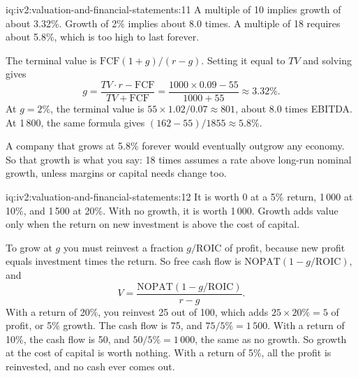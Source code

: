 \begin{solution}{iq:iv2:valuation-and-financial-statements:11}
A multiple of 10 implies growth of about 3.32\%. Growth of 2\% implies about 8.0 times. A multiple of 18 requires about 5.8\%, which is too high to last forever.

The terminal value is $\mathrm{FCF}(1 + g)/(r - g)$. Setting it equal to $TV$ and solving gives
\[
g = \frac{TV \cdot r - \mathrm{FCF}}{TV + \mathrm{FCF}} = \frac{1000 \times 0.09 - 55}{1000 + 55} \approx 3.32\%.
\]
At $g = 2\%$, the terminal value is $55 \times 1.02/0.07 \approx 801$, about 8.0 times EBITDA. At 1\,800, the same formula gives $(162 - 55)/1855 \approx 5.8\%$.

A company that grows at 5.8\% forever would eventually outgrow any economy. So that growth is what you say: 18 times assumes a rate above long-run nominal growth, unless margins or capital needs change too.

\end{solution}

\begin{solution}{iq:iv2:valuation-and-financial-statements:12}
It is worth 0 at a 5\% return, 1\,000 at 10\%, and 1\,500 at 20\%. With no growth, it is worth 1\,000. Growth adds value only when the return on new investment is above the cost of capital.

To grow at $g$ you must reinvest a fraction $g/\mathrm{ROIC}$ of profit, because new profit equals investment times the return. So free cash flow is $\mathrm{NOPAT}(1 - g/\mathrm{ROIC})$, and
\[
V = \frac{\mathrm{NOPAT}\left(1 - g/\mathrm{ROIC}\right)}{r - g}.
\]
With a return of 20\%, you reinvest 25 out of 100, which adds $25 \times 20\% = 5$ of profit, or 5\% growth. The cash flow is 75, and $75/5\% = 1\,500$. With a return of 10\%, the cash flow is 50, and $50/5\% = 1\,000$, the same as no growth. So growth at the cost of capital is worth nothing. With a return of 5\%, all the profit is reinvested, and no cash ever comes out.

\end{solution}

